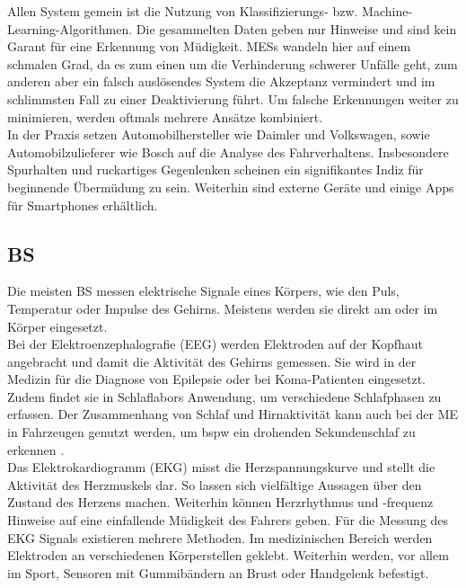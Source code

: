 {Allen System gemein ist die Nutzung von Klassifizierungs- bzw. Machine-Learning-Algorithmen. Die gesammelten Daten geben nur Hinweise und sind kein Garant für eine Erkennung von Müdigkeit. \acl{MESs} wandeln hier auf einem schmalen Grad, da es zum einen um die Verhinderung schwerer Unfälle geht, zum anderen aber ein falsch auslösendes System die Akzeptanz vermindert und im schlimmsten Fall zu einer Deaktivierung führt. Um falsche Erkennungen weiter zu minimieren, werden oftmals mehrere Ansätze kombiniert.\\

In der Praxis setzen Automobilhersteller wie Daimler \cite{Daimler} und Volkswagen, sowie Automobilzulieferer wie Bosch \cite{Bosch} auf die Analyse des Fahrverhaltens. Insbesondere Spurhalten und ruckartiges Gegenlenken scheinen ein signifikantes Indiz für beginnende Übermüdung zu sein. Weiterhin sind externe Geräte und einige Apps für Smartphones erhältlich.

\subsection{\acl{BS}}
Die meisten \acl{BS} messen elektrische Signale eines Körpers, wie den Puls, Temperatur oder Impulse des Gehirns. Meistens werden sie direkt am oder im Körper eingesetzt.\\

Bei der Elektroenzephalografie (EEG) werden Elektroden auf der Kopfhaut angebracht und damit die Aktivität des Gehirns gemessen. Sie wird in der Medizin für die Diagnose von Epilepsie oder bei Koma-Patienten eingesetzt. Zudem findet sie in Schlaflabors Anwendung, um verschiedene Schlafphasen zu erfassen. Der Zusammenhang von Schlaf und Hirnaktivität kann auch bei der \acl{ME} in Fahrzeugen genutzt werden, um \acl{bspw} ein drohenden Sekundenschlaf zu erkennen \cite{Santamaria_eeg}. \\

Das Elektrokardiogramm (EKG) misst die Herzspannungskurve und stellt die Aktivität des Herzmuskels dar. So lassen sich vielfältige Aussagen über den Zustand des Herzens machen. Weiterhin können Herzrhythmus und -frequenz Hinweise auf eine einfallende Müdigkeit des Fahrers geben. Für die Messung des EKG Signals existieren mehrere Methoden. Im medizinischen Bereich werden Elektroden an verschiedenen Körperstellen geklebt. Weiterhin werden, vor allem im Sport, Sensoren mit Gummibändern an Brust oder Handgelenk befestigt. \\

}
